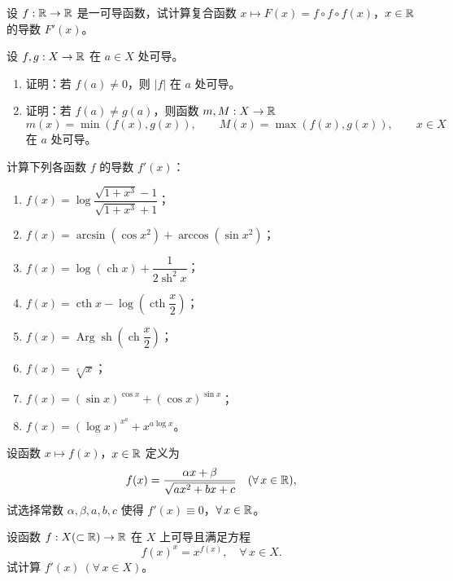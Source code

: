 \begin{exercise}
	\item 设 \(f:\mathbb{R}\to\mathbb{R}\) 是一可导函数，试计算复合函数 \(x\longmapsto F(x)=f\circ f\circ f(x)\)，\(x\in\mathbb{R}\) 的导数 \(F'(x)\)。
\end{exercise}

\begin{exercise}
	\item 设 \(f,g:X\to\mathbb{R}\) 在 \(a\in X\) 处可导。
	\begin{enumerate}[label=\arabic*)]
		\item 证明：若 \(f(a)\neq0\)，则 \(|f|\) 在 \(a\) 处可导。
		\item 证明：若 \(f(a)\neq g(a)\)，则函数 \(m,M:X\to\mathbb{R}\)
		\[
		m(x)=\min(f(x),g(x)),\qquad M(x)=\max(f(x),g(x)),\qquad x\in X
		\]
		在 \(a\) 处可导。
	\end{enumerate}
\end{exercise}

\begin{exercise}
	\item 计算下列各函数 \(f\) 的导数 \(f'(x)\)：
	\begin{enumerate}[label=\arabic*)]
		\item \(f(x)=\log\dfrac{\sqrt{1+x^3}-1}{\sqrt{1+x^3}+1}\)；
		\item \(f(x)=\arcsin(\cos x^2)+\arccos(\sin x^2)\)；
		\item \(f(x)=\log(\operatorname{ch}x)+\dfrac1{2\operatorname{sh}^2x}\)；
		\item \(f(x)=\operatorname{cth}x-\log\left(\operatorname{cth}\dfrac x2\right)\)；
		\item \(f(x)=\operatorname{Arg}\operatorname{sh}\left(\operatorname{ch}\dfrac x2\right)\)；
		\item \(f(x)=\sqrt[x]{x}\)；
		\item \(f(x)=(\sin x)^{\cos x}+(\cos x)^{\sin x}\)；
		\item \(f(x)=(\log x)^{x^a}+x^{a\log x}\)。
	\end{enumerate}
\end{exercise}

\begin{exercise}
	\item 设函数 \(x\longmapsto f(x)\)，\(x\in\mathbb{R}\) 定义为
	\[
	f(x)=\frac{\alpha x+\beta}{\sqrt{ax^2+bx+c}}\quad(\forall\,x\in\mathbb{R}),
	\]
	试选择常数 \(\alpha,\beta,a,b,c\) 使得 \(f'(x)\equiv0\)，\(\forall\,x\in\mathbb{R}\)。
\end{exercise}

\begin{exercise}
	\item 设函数 \(f:X(\subset\mathbb{R})\to\mathbb{R}\) 在 \(X\) 上可导且满足方程
	\[
	f(x)^x=x^{f(x)},\quad\forall\,x\in X.
	\]
	试计算 \(f'(x)\ (\forall\,x\in X)\)。
\end{exercise}

